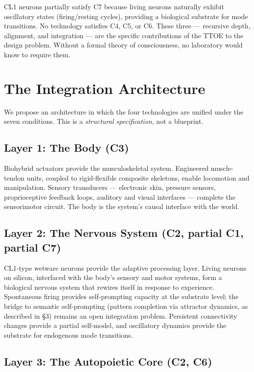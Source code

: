 \documentclass[12pt, letterpaper]{article}
\begin{document}
CL1 neurons partially satisfy C7 because living neurons naturally exhibit oscillatory states (firing/resting cycles), providing a biological substrate for mode transitions. No technology satisfies C4, C5, or C6. These three --- recursive depth, alignment, and integration --- are the specific contributions of the TTOE to the design problem. Without a formal theory of consciousness, no laboratory would know to require them.

\section{The Integration Architecture}

We propose an architecture in which the four technologies are unified under the seven conditions. This is a \textit{structural specification}, not a blueprint.

\subsection{Layer 1: The Body (C3)}

Biohybrid actuators provide the musculoskeletal system. Engineered muscle-tendon units, coupled to rigid-flexible composite skeletons, enable locomotion and manipulation. Sensory transducers --- electronic skin, pressure sensors, proprioceptive feedback loops, auditory and visual interfaces --- complete the sensorimotor circuit. The body is the system's causal interface with the world.

\subsection{Layer 2: The Nervous System (C2, partial C1, partial C7)}

CL1-type wetware neurons provide the adaptive processing layer. Living neurons on silicon, interfaced with the body's sensory and motor systems, form a biological nervous system that rewires itself in response to experience. Spontaneous firing provides self-prompting capacity at the substrate level; the bridge to semantic self-prompting (pattern completion via attractor dynamics, as described in \S3) remains an open integration problem. Persistent connectivity changes provide a partial self-model, and oscillatory dynamics provide the substrate for endogenous mode transitions.

\subsection{Layer 3: The Autopoietic Core (C2, C6)}
\end{document}
